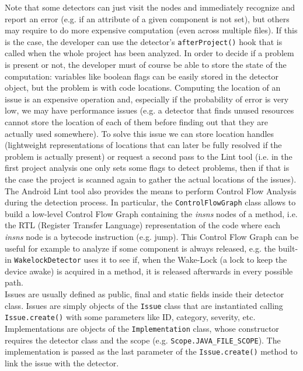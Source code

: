 \documentclass[11pt,a4paper,notitlepage]{article}
\begin{document}
Note that some detectors can just visit the nodes and immediately recognize and report an error (e.g. if an attribute of a given component is not set), but others may require to do more expensive computation (even across multiple files). If this is the case, the developer can use the detector's \texttt{afterProject()} hook that is called when the whole project has been analyzed. In order to decide if a problem is present or not, the developer must of course be able to store the state of the computation: variables like boolean flags can be easily stored in the detector object, but the problem is with code locations. Computing the location of an issue is an expensive operation and, especially if the probability of error is very low, we may have performance issues (e.g. a detector that finds unused resources cannot store the location of each of them before finding out that they are actually used somewhere). To solve this issue we can store location handles (lightweight representations of locations that can later be fully resolved if the problem is actually present) or request a second pass to the Lint tool (i.e. in the first project analysis one only sets some flags to detect problems, then if that is the case the project is scanned again to gather the actual locations of the issues).\medskip \\
The Android Lint tool also provides the means to perform Control Flow Analysis during the detection process. In particular, the \texttt{ControlFlowGraph} class allows to build a low-level Control Flow Graph containing the \textit{insns} nodes of a method, i.e. the RTL (Register Transfer Language) representation of the code where each \textit{insns} node is a bytecode instruction (e.g. jump). This Control Flow Graph can be useful for example to analyze if some component is always released, e.g. the built-in \texttt{WakelockDetector} uses it to see if, when the Wake-Lock (a lock to keep the device awake) is acquired in a method, it is released afterwards in every possible path.\bigskip \\
Issues are usually defined as public, final and static fields inside their detector class. Issues are simply objects of the \texttt{Issue} class that are instantiated calling \texttt{Issue.create()} with some parameters like ID, category, severity, etc.\bigskip \\
Implementations are objects of the \texttt{Implementation} class, whose constructor requires the detector class and the scope (e.g. \texttt{Scope.JAVA\_FILE\_SCOPE}). The implementation is passed as the last parameter of the \texttt{Issue.create()} method to link the issue with the detector.\bigskip \\
\end{document}
